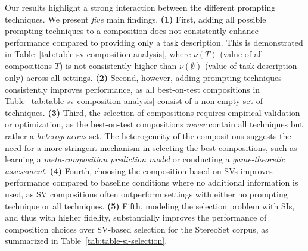 Our results highlight a strong interaction between the different prompting techniques.
We present \emph{five} main findings.
\textbf{(1)} First, adding all possible prompting techniques to a composition does not consistently enhance performance compared to providing only a task description.
This is demonstrated in Table~\ref{tab:table-sv-composition-analysis}, where $\nu(T)$ (value of all compositions $T$) is not consistently higher than $\nu(\emptyset)$ (value of task description only) across all settings.
\textbf{(2)} Second, however, adding prompting techniques consistently improves performance, as all best-on-test compositions in Table~\ref{tab:table-sv-composition-analysis} consist of a non-empty set of techniques.
\textbf{(3)} Third, the selection of compositions requires empirical validation or optimization, as the best-on-test compositions \emph{never} contain all techniques but rather a \emph{heterogeneous} set.
The heterogeneity of the compositions suggests the need for a more stringent mechanism in selecting the best compositions, such as learning a \emph{meta-composition prediction model} or conducting a \emph{game-theoretic assessment}.
\textbf{(4)} Fourth, choosing the composition based on SVs improves performance compared to baseline conditions where no additional information is used, as SV compositions often outperform settings with either no prompting technique or all techniques.
\textbf{(5)} Fifth, modeling the selection problem with SIs, and thus with higher fidelity, substantially improves the performance of composition choices over SV-based selection for the StereoSet corpus, as summarized in Table~\ref{tab:table-si-selection}.






